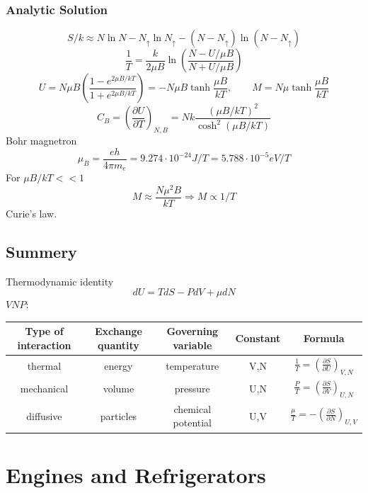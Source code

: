\documentclass[a4paper,norsk, 10pt]{article}
\begin{document}
\subsubsection{Analytic Solution}
\begin{equation}
S/k \approx N\ln N - N_\uparrow \ln N_\uparrow - (N-N_\uparrow)\ln(N-N_\uparrow)
\end{equation}
\begin{equation}
\frac{1}{T} = \frac{k}{2\mu B}\ln\left(\frac{N- U/\mu B}{N+ U/\mu B}\right)
\end{equation}
\begin{equation}
U = N\mu B\left(\frac{1-e^{2\mu B/kT}}{1+e^{2\mu B/kT}}\right) = -N\mu B\tanh\frac{\mu B}{kT},\qquad M = N\mu \tanh\frac{\mu B}{kT}
\end{equation}
\begin{equation}
C_B = \left(\frac{\partial U}{\partial T}\right)_{N,B} = Nk \frac{(\mu B/kT)^2}{\cosh^2(\mu B/kT	)}
\end{equation}
Bohr magnetron
\begin{equation}
\mu_B = \frac{eh}{4\pi m_e} = 9.274\cdot10^{-24} J/T = 5.788\cdot10^{-5}eV/T
\end{equation}
For $\mu B/kT << 1$
\begin{equation}
M\approx \frac{N\mu^2B}{kT} \Rightarrow M \propto 1/T
\end{equation}
Curie's law.
\subsection{Summery}
Thermodynamic identity
\begin{equation}
dU = TdS - PdV + \mu dN
\end{equation}
$VNP:$
\begin{table}[H]
\centering
\begin{tabular}{c c c c c}
Type of interaction & Exchange quantity & Governing variable & Constant & Formula\\
\hline
thermal & energy & temperature & V,N & $\frac{1}{T} = \left(\frac{\partial S}{\partial U}\right)_{V,N}$\\
mechanical & volume & pressure & U,N & $\frac{P}{T} = \left(\frac{\partial S}{\partial V}\right)_{U,N}$\\
diffusive & particles & chemical potential & U,V & $\frac{\mu}{T} = -\left(\frac{\partial S}{\partial N}\right)_{U,V}$
\end{tabular}
\end{table}
\section{Engines and Refrigerators}
\end{document}
